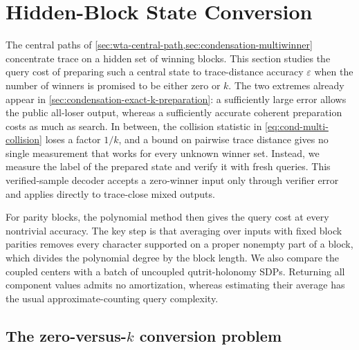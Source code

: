 \section{Hidden-Block State Conversion}
\label{sec:state-conversion}

The central paths of \cref{sec:wta-central-path,sec:condensation-multiwinner}
concentrate trace on a hidden set of winning blocks.  This section studies the query cost of
preparing such a central state to trace-distance accuracy $\varepsilon$ when
the number of winners is promised to be either zero or $k$.  The two
extremes already appear in \cref{sec:condensation-exact-k-preparation}: a
sufficiently large error allows the public all-loser output, whereas a
sufficiently accurate coherent preparation costs as much as search.  In
between, the collision statistic in
\eqref{eq:cond-multi-collision} loses a factor $1/k$, and a bound on
pairwise trace distance gives no single measurement that works for every
unknown winner set.  Instead, we measure the label of the prepared state and
verify it with fresh queries.  This verified-sample decoder accepts a
zero-winner input only through verifier error and applies directly to
trace-close mixed outputs.

For parity blocks, the polynomial method then gives the query cost at every
nontrivial accuracy.  The key step is that averaging over inputs with fixed
block parities removes every character supported on a proper nonempty part
of a block, which divides the polynomial degree by the block length.  We
also compare the coupled centers with a batch of uncoupled qutrit-holonomy
SDPs.  Returning all component values admits no amortization, whereas
estimating their average has the usual approximate-counting query
complexity.

\subsection{The zero-versus-\texorpdfstring{$k$}{k} conversion problem}
\label{sec:state-conversion-model}

